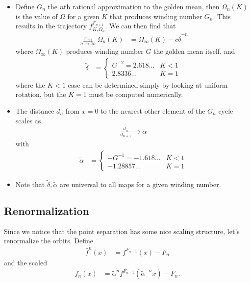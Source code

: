 \documentclass[12pt]{article}
\begin{document}
\begin{itemize}
    \item Define $G_n$ the $n$th rational approximation to the golden mean, then
        $\Omega_n(K)$ is the value of $\Omega$ for a given $K$ that produces
        winding number $G_n$. This results in the trajectory
        $f_{K,\Omega_n}^{F_{n+1}}$. We can then find that
        \begin{align}
            \lim_{n \to \infty}\Omega_n(K) &=
                \Omega_\infty(K) - c\tilde{\delta}^{-n}
        \end{align}
        where $\Omega_\infty(K)$ produces winding number $G$ the golden mean
        itself, and
        \begin{align}
            \tilde{\delta} &=
            \begin{cases}
                G^{-2} = 2.618\dots & K < 1\\
                2.8336\dots & K = 1
            \end{cases}
        \end{align}
        where the $K < 1$ case can be determined simply by looking at uniform
        rotation, but the $K = 1$ must be computed numerically.

    \item The distance $d_n$ from $x=0$ to the nearest other element of the
        $G_n$ cycle scales as
        \begin{align}
            \frac{d_n}{d_{n+1}} \to \tilde{\alpha}
        \end{align}
        with
        \begin{align}
            \tilde{\alpha} &=
            \begin{cases}
                -G^{-1} = -1.618\dots & K < 1\\
                -1.28857\dots & K = 1
            \end{cases}
        \end{align}

    \item Note that $\tilde{\delta}, \tilde{\alpha}$ are universal to all maps
        for a given winding number.
\end{itemize}

\subsection{Renormalization}

Since we notice that the point separation has some nice scaling structure, let's
renormalize the orbits. Define
\begin{align}
    \bar{f}^n(x) &= f^{F_{n+1}}(x) - F_n
\end{align}
and the scaled
\begin{align}
    \bar{f}_n(x) &= \tilde{\alpha}^n f^{F_{n+1}}(\tilde{\alpha}^{-n}x) - F_n.
\end{align}
\end{document}

